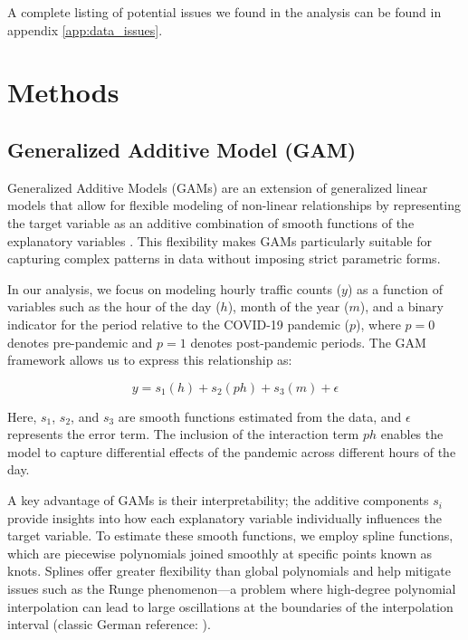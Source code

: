 \documentclass{article}
\begin{document}
A complete listing of potential issues we found in the analysis can be found in appendix \ref{app:data_issues}. 

\section{Methods}

\subsection{Generalized Additive Model (GAM)}

Generalized Additive Models (GAMs) are an extension of generalized linear models that allow for flexible modeling of non-linear relationships by representing the target variable as an additive combination of smooth functions of the explanatory variables \cite{gam, gam_truck_drivers, gam_crash_frequency}. This flexibility makes GAMs particularly suitable for capturing complex patterns in data without imposing strict parametric forms.

In our analysis, we focus on modeling hourly traffic counts (\( y \)) as a function of variables such as the hour of the day (\( h \)), month of the year (\( m \)), and a binary indicator for the period relative to the COVID-19 pandemic (\( p \)), where \( p = 0 \) denotes pre-pandemic and \( p = 1 \) denotes post-pandemic periods. The GAM framework allows us to express this relationship as:

\[
y = s_1(h) + s_2(ph) + s_3(m) + \epsilon
\]

Here, \( s_1 \), \( s_2 \), and \( s_3 \) are smooth functions estimated from the data, and \( \epsilon \) represents the error term. The inclusion of the interaction term \( ph \) enables the model to capture differential effects of the pandemic across different hours of the day.

A key advantage of GAMs is their interpretability; the additive components \( s_i \) provide insights into how each explanatory variable individually influences the target variable. To estimate these smooth functions, we employ spline functions, which are piecewise polynomials joined smoothly at specific points known as knots. Splines offer greater flexibility than global polynomials and help mitigate issues such as the Runge phenomenon—a problem where high-degree polynomial interpolation can lead to large oscillations at the boundaries of the interpolation interval (classic German reference: \cite{runge1901empirische}).
\end{document}

